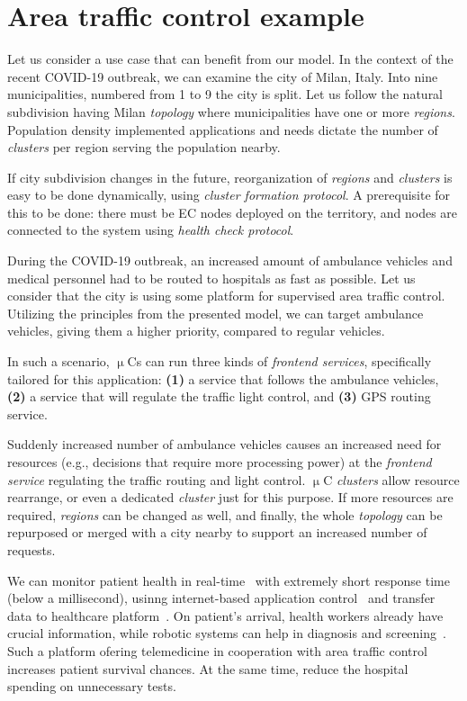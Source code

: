 \section{Area traffic control example}\label{sec:covid_example}
%
Let us consider a use case that can benefit from our model. In the context of the recent COVID-19 outbreak, we can examine the city of Milan, Italy. Into nine municipalities, numbered from 1 to 9 the city is split. Let us follow the natural subdivision having Milan \emph{topology} where municipalities have one or more \emph{regions}. Population density implemented applications and needs dictate the number of \emph{clusters} per region serving the population nearby. 

If city subdivision changes in the future, reorganization of \emph{regions} and \emph{clusters} is easy to be done dynamically, using \emph{cluster formation protocol}. A prerequisite for this to be done: there must be EC nodes deployed on the territory, and nodes are connected to the system using \emph{health check protocol}.

During the COVID-19 outbreak, an increased amount of ambulance vehicles and medical personnel had to be routed to hospitals as fast as possible. Let us consider that the city is using some platform for supervised area traffic control. Utilizing the principles from the presented model, we can target ambulance vehicles, giving them a higher priority, compared to regular vehicles.

In such a scenario, $\upmu$Cs can run three kinds of \emph{frontend services}, specifically tailored for this application: \textbf{(1)} a service that follows the ambulance vehicles, \textbf{(2)} a service that will regulate the traffic light control, and \textbf{(3)} GPS routing service.

Suddenly increased number of ambulance vehicles causes an increased need for resources (e.g., decisions that require more processing power) at the \emph{frontend service} regulating the traffic routing and light control. $\upmu$C \emph{clusters} allow resource rearrange, or even a dedicated \emph{cluster} just for this purpose. If more resources are required, \emph{regions} can be changed as well, and finally, the whole \emph{topology} can be repurposed or merged with a city nearby to support an increased number of requests.

We can monitor patient health in real-time~\cite{BCAK19, JeonK19, ChiariniRAMG13} with extremely short response time (below a millisecond), usinng internet-based application control~\cite{fitzek2021tactile} and transfer data to healthcare platform~\cite{OmarBBKR19, inproceedingsSimic5}. On patient's arrival, health workers already have crucial information, while robotic systems can help in diagnosis and screening~\cite{ShenGLMDXHKCZT21}. Such a platform ofering telemedicine in cooperation with area traffic control increases patient survival chances. At the same time, reduce the hospital spending on unnecessary tests.

